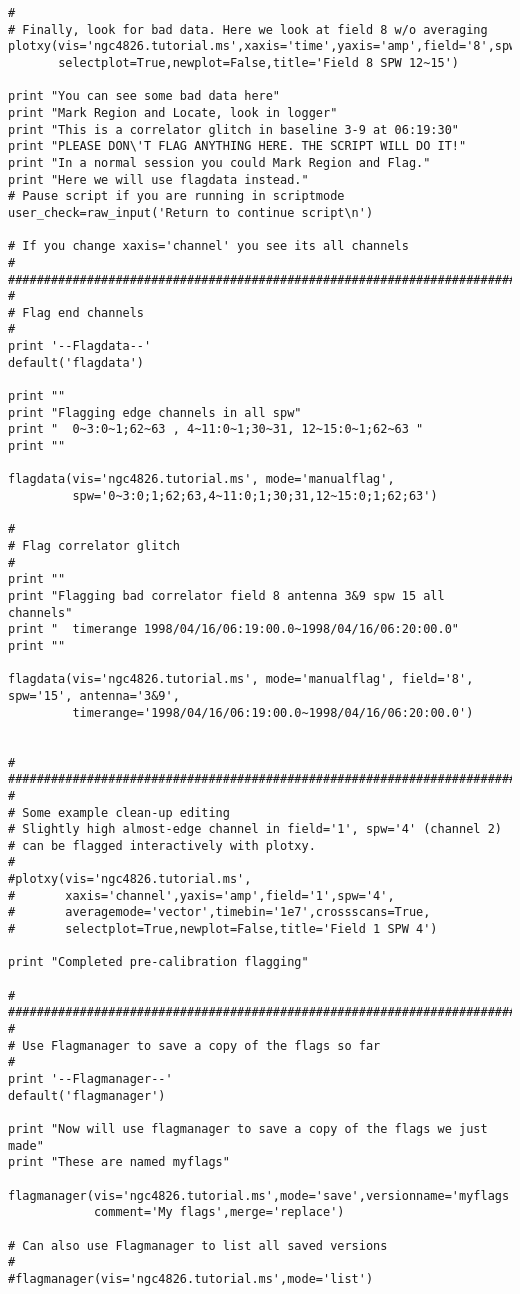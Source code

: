 \begin{verbatim}
#
# Finally, look for bad data. Here we look at field 8 w/o averaging
plotxy(vis='ngc4826.tutorial.ms',xaxis='time',yaxis='amp',field='8',spw='12~15',
       selectplot=True,newplot=False,title='Field 8 SPW 12~15')

print "You can see some bad data here"
print "Mark Region and Locate, look in logger"
print "This is a correlator glitch in baseline 3-9 at 06:19:30"
print "PLEASE DON\'T FLAG ANYTHING HERE. THE SCRIPT WILL DO IT!"
print "In a normal session you could Mark Region and Flag."
print "Here we will use flagdata instead."
# Pause script if you are running in scriptmode
user_check=raw_input('Return to continue script\n')

# If you change xaxis='channel' you see its all channels
#
##########################################################################
#
# Flag end channels
#
print '--Flagdata--'
default('flagdata')

print ""
print "Flagging edge channels in all spw"
print "  0~3:0~1;62~63 , 4~11:0~1;30~31, 12~15:0~1;62~63 "
print ""

flagdata(vis='ngc4826.tutorial.ms', mode='manualflag',
         spw='0~3:0;1;62;63,4~11:0;1;30;31,12~15:0;1;62;63')

#
# Flag correlator glitch
#
print ""
print "Flagging bad correlator field 8 antenna 3&9 spw 15 all channels"
print "  timerange 1998/04/16/06:19:00.0~1998/04/16/06:20:00.0"
print ""

flagdata(vis='ngc4826.tutorial.ms', mode='manualflag', field='8', spw='15', antenna='3&9', 
         timerange='1998/04/16/06:19:00.0~1998/04/16/06:20:00.0')


#
##########################################################################
#
# Some example clean-up editing
# Slightly high almost-edge channel in field='1', spw='4' (channel 2)
# can be flagged interactively with plotxy.
#
#plotxy(vis='ngc4826.tutorial.ms',
#       xaxis='channel',yaxis='amp',field='1',spw='4',
#       averagemode='vector',timebin='1e7',crossscans=True,
#       selectplot=True,newplot=False,title='Field 1 SPW 4')

print "Completed pre-calibration flagging"

#
##########################################################################
#
# Use Flagmanager to save a copy of the flags so far
#
print '--Flagmanager--'
default('flagmanager')

print "Now will use flagmanager to save a copy of the flags we just made"
print "These are named myflags"

flagmanager(vis='ngc4826.tutorial.ms',mode='save',versionname='myflags',
            comment='My flags',merge='replace')

# Can also use Flagmanager to list all saved versions
#
#flagmanager(vis='ngc4826.tutorial.ms',mode='list')

\end{verbatim}
